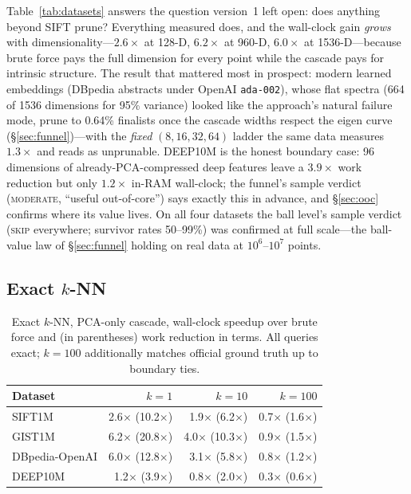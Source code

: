 \documentclass[sigconf,nonacm]{acmart}
\begin{document}
Table~\ref{tab:datasets} answers the question version~1 left open: does
anything beyond SIFT prune? Everything measured does, and the wall-clock
gain \emph{grows} with dimensionality---$2.6\times$ at 128-D,
$6.2\times$ at 960-D, $6.0\times$ at 1536-D---because brute force pays the
full dimension for every point while the cascade pays for intrinsic
structure. The result that mattered most in prospect: modern learned
embeddings (DBpedia abstracts under OpenAI \texttt{ada-002}), whose flat
spectra (664 of 1536 dimensions for 95\% variance) looked like the
approach's natural failure mode, prune to 0.64\% finalists once the
cascade widths respect the eigen curve (\S\ref{sec:funnel})---with the
\emph{fixed} $(8,16,32,64)$ ladder the same data measures $1.3\times$ and
reads as unprunable. DEEP10M is the honest boundary case: 96 dimensions of
already-PCA-compressed deep features leave a $3.9\times$ work reduction
but only $1.2\times$ in-RAM wall-clock; the funnel's sample verdict
(\textsc{moderate}, ``useful out-of-core'') says exactly this in advance,
and \S\ref{sec:ooc} confirms where its value lives. On all four datasets
the ball level's sample verdict (\textsc{skip} everywhere; survivor rates
50--99\%) was confirmed at full scale---the ball-value law of
\S\ref{sec:funnel} holding on real data at $10^6$--$10^7$ points.

\subsection{Exact $k$-NN}
\label{sec:knn-eval}

\begin{table}[t]
\caption{Exact $k$-NN, PCA-only cascade, wall-clock speedup over brute
force and (in parentheses) work reduction in terms. All queries exact;
$k{=}100$ additionally matches official ground truth up to boundary ties.}
\label{tab:knn}
\small
\begin{tabular}{@{}lrrr@{}}
\toprule
Dataset & $k=1$ & $k=10$ & $k=100$ \\
\midrule
SIFT1M & 2.6$\times$ (10.2$\times$) & 1.9$\times$ (6.2$\times$) & 0.7$\times$ (1.6$\times$) \\
GIST1M & 6.2$\times$ (20.8$\times$) & 4.0$\times$ (10.3$\times$) & 0.9$\times$ (1.5$\times$) \\
DBpedia-OpenAI & 6.0$\times$ (12.8$\times$) & 3.1$\times$ (5.8$\times$) & 0.8$\times$ (1.2$\times$) \\
DEEP10M & 1.2$\times$ (3.9$\times$) & 0.8$\times$ (2.0$\times$) & 0.3$\times$ (0.6$\times$) \\
\bottomrule
\end{tabular}
\end{table}
\end{document}
